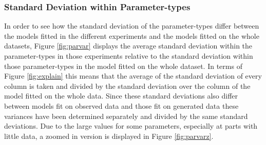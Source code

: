 \documentclass{scrartcl}
\begin{document}
\subsubsection{Standard Deviation within Parameter-types}
\label{sec:parvar}
In order to see how the standard deviation of the parameter-types differ between the models fitted in the different experiments and the models fitted on the whole datasets, Figure \ref{fig:parvar} displays the average standard deviation within the parameter-types in those experiments relative to the standard deviation within those parameter-types in the model fitted on the whole dataset. In terms of Figure \ref{fig:explain} this means that the average of the standard deviation of every column is taken and divided by the standard deviation over the column of the model fitted on the whole data. Since these standard deviations also differ between models fit on observed data and those fit on generated data these variances have been determined separately and divided by the same standard deviations. Due to the large values for some parameters, especially at parts with little data, a zoomed in version is displayed in Figure \ref{fig:parvarz}. 
\end{document}
